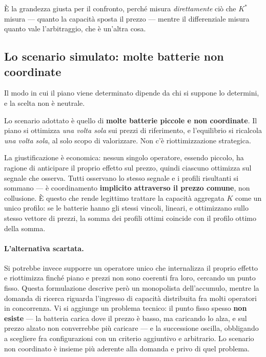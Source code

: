 \`E la grandezza giusta per il confronto, perch\'e misura \emph{direttamente} ci\`o che $K^*$
misura --- quanto la capacit\`a sposta il prezzo --- mentre il differenziale misura quanto vale
l'arbitraggio, che \`e un'altra cosa.

\subsection{Lo scenario simulato: molte batterie non coordinate}
\label{sec:scenario}

Il modo in cui il piano viene determinato dipende da chi si suppone lo determini, e la scelta
non \`e neutrale.

Lo scenario adottato \`e quello di \textbf{molte batterie piccole e non coordinate}. Il piano
si ottimizza \emph{una volta sola} sui prezzi di riferimento, e l'equilibrio si ricalcola
\emph{una volta sola}, al solo scopo di valorizzare. Non c'\`e riottimizzazione strategica.

La giustificazione \`e economica: nessun singolo operatore, essendo piccolo, ha ragione di
anticipare il proprio effetto sul prezzo, quindi ciascuno ottimizza sul segnale che osserva.
Tutti osservano lo stesso segnale e i profili risultanti si sommano — \`e coordinamento
\textbf{implicito attraverso il prezzo comune}, non collusione. \`E questo che rende
legittimo trattare la capacit\`a aggregata $K$ come un unico profilo: se le batterie hanno
gli stessi vincoli, lineari, e ottimizzano sullo stesso vettore di prezzi, la somma dei
profili ottimi coincide con il profilo ottimo della somma.

\paragraph{L'alternativa scartata.} Si potrebbe invece supporre un operatore unico che
internalizza il proprio effetto e riottimizza finch\'e piano e prezzi non sono coerenti fra
loro, cercando un punto fisso. Questa formulazione descrive per\`o un monopolista
dell'accumulo, mentre la domanda di ricerca riguarda l'ingresso di capacit\`a distribuita fra
molti operatori in concorrenza. Vi si aggiunge un problema tecnico: il punto fisso spesso
\textbf{non esiste} — la batteria carica dove il prezzo \`e basso, ma caricando lo alza, e sul
prezzo alzato non converrebbe pi\`u caricare — e la successione oscilla, obbligando a
scegliere fra configurazioni con un criterio aggiuntivo e arbitrario. Lo scenario non
coordinato \`e insieme pi\`u aderente alla domanda e privo di quel problema.

